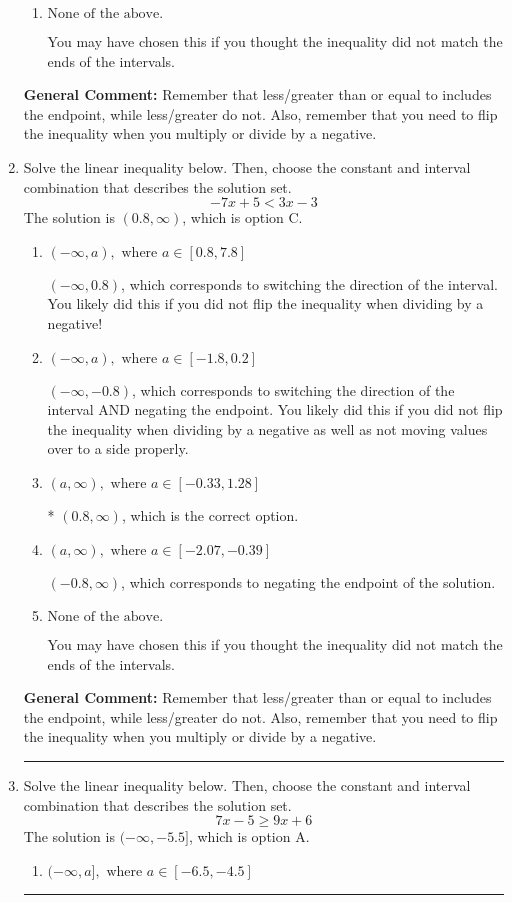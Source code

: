 \documentclass{extbook}[14pt]
\newcommand{\litem}[1]{\item #1

\rule{\textwidth}{0.4pt}}
\begin{document}
\begin{enumerate}
{\begin{enumerate}[label=\Alph*.]
 $(-\infty, 2.143)$, which corresponds to switching the direction of the interval AND negating the endpoint. You likely did this if you did not flip the inequality when dividing by a negative as well as not moving values over to a side properly.
\item \( \text{None of the above}. \)

You may have chosen this if you thought the inequality did not match the ends of the intervals.
\end{enumerate}

\textbf{General Comment:} Remember that less/greater than or equal to includes the endpoint, while less/greater do not. Also, remember that you need to flip the inequality when you multiply or divide by a negative.
}
\litem{
Solve the linear inequality below. Then, choose the constant and interval combination that describes the solution set.
\[ -7x + 5 < 3x -3 \]The solution is \( (0.8, \infty) \), which is option C.\begin{enumerate}[label=\Alph*.]
\item \( (-\infty, a), \text{ where } a \in [0.8, 7.8] \)

 $(-\infty, 0.8)$, which corresponds to switching the direction of the interval. You likely did this if you did not flip the inequality when dividing by a negative!
\item \( (-\infty, a), \text{ where } a \in [-1.8, 0.2] \)

 $(-\infty, -0.8)$, which corresponds to switching the direction of the interval AND negating the endpoint. You likely did this if you did not flip the inequality when dividing by a negative as well as not moving values over to a side properly.
\item \( (a, \infty), \text{ where } a \in [-0.33, 1.28] \)

* $(0.8, \infty)$, which is the correct option.
\item \( (a, \infty), \text{ where } a \in [-2.07, -0.39] \)

 $(-0.8, \infty)$, which corresponds to negating the endpoint of the solution.
\item \( \text{None of the above}. \)

You may have chosen this if you thought the inequality did not match the ends of the intervals.
\end{enumerate}

\textbf{General Comment:} Remember that less/greater than or equal to includes the endpoint, while less/greater do not. Also, remember that you need to flip the inequality when you multiply or divide by a negative.
}
\litem{
Solve the linear inequality below. Then, choose the constant and interval combination that describes the solution set.
\[ 7x -5 \geq 9x + 6 \]The solution is \( (-\infty, -5.5] \), which is option A.\begin{enumerate}[label=\Alph*.]
\item \( (-\infty, a], \text{ where } a \in [-6.5, -4.5] \)


\end{enumerate}}
\end{enumerate}
\end{document}
